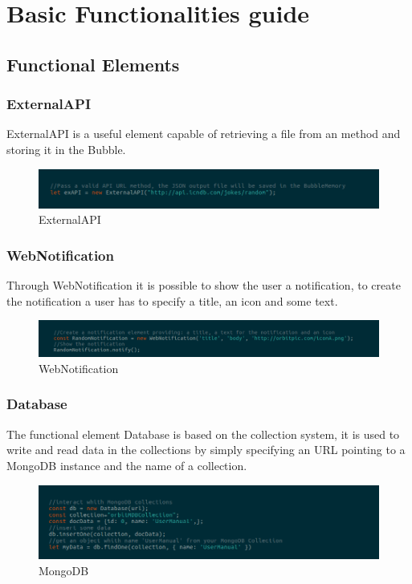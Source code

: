 \section{Basic Functionalities guide}
\subsection{Functional Elements}

\subsubsection{ExternalAPI}
ExternalAPI is a useful element capable of retrieving a  file from an  method and storing it in the Bubble. 
\begin{figure}[H]
 	\centering
 	\includegraphics[width=14cm]{../../documenti/UserManualFramework/framework_model/1framework_model_api.png}
 	\caption{ExternalAPI}
\end{figure}

\subsubsection{WebNotification}
Through WebNotification it is possible to show the user a notification, to create the notification a user has to specify a title, an icon and some text. 
\begin{figure}[H]
	\centering
	\includegraphics[width=14cm]{../../documenti/UserManualFramework/framework_model/2framework_model_notification.png}
	\caption{WebNotification}
\end{figure}

\subsubsection{Database}
The functional element Database is based on the  collection system, it is used to write and read data in the collections by simply specifying an URL pointing to a MongoDB instance and the name of a collection.
\begin{figure}[H]
	\centering
	\includegraphics[width=14cm]{../../documenti/UserManualFramework/framework_model/3framework_model_mongo.png}
	\caption{MongoDB}
\end{figure}

